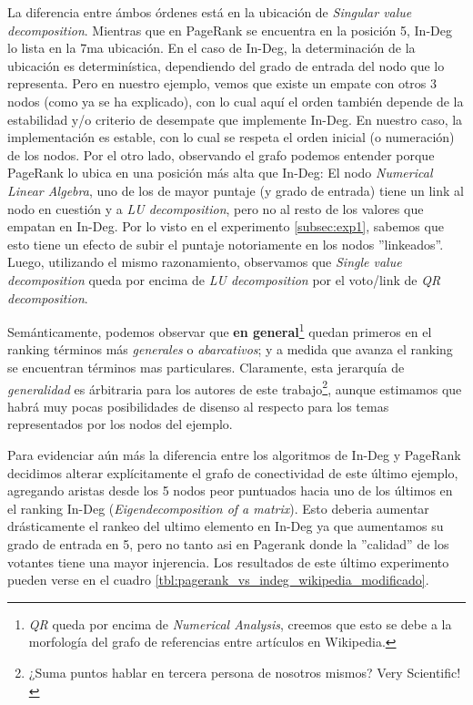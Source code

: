 \par La diferencia entre \'ambos \'ordenes est\'a en la ubicaci\'on de
\emph{Singular value decomposition}. Mientras que en PageRank se encuentra en la
posici\'on 5, In-Deg lo lista en la 7ma ubicaci\'on. En el caso de In-Deg, la
determinaci\'on de la ubicaci\'on es determin\'istica, dependiendo del grado de
entrada del nodo que lo representa. Pero en nuestro ejemplo, vemos que existe un
empate con otros 3 nodos (como ya se ha explicado), con lo cual aqu\'i el orden
tambi\'en depende de la estabilidad y/o criterio de desempate que implemente
In-Deg. En nuestro caso, la implementaci\'on es estable, con lo cual se respeta
el orden inicial (o numeraci\'on) de los nodos. Por el otro lado, observando el
grafo podemos entender porque PageRank lo ubica en una posici\'on m\'as alta que
In-Deg: El nodo \emph{Numerical Linear Algebra}, uno de los de mayor puntaje (y
grado de entrada) tiene un link al nodo en cuesti\'on y a \emph{LU
decomposition}, pero no al resto de los valores que empatan en In-Deg. Por lo
visto en el experimento \ref{subsec:exp1}, sabemos que esto tiene un efecto de
subir el puntaje notoriamente en los nodos ''linkeados''. Luego, utilizando el
mismo razonamiento, observamos que \emph{Single value decomposition} queda por
encima de \emph{LU decomposition} por el voto/link de \emph{QR decomposition}.

\par Semánticamente, podemos observar que \textbf{en general}\footnote{\emph{QR}
queda por encima de \emph{Numerical Analysis}, creemos que esto se debe a la
morfología del grafo de referencias entre artículos en Wikipedia.} quedan
primeros en el ranking términos más \emph{generales} o \emph{abarcativos}; y a
medida que avanza el ranking se encuentran términos mas particulares.
Claramente, esta jerarqu\'ia de \emph{generalidad} es \'arbitraria para los
autores de este trabajo\footnote{¿Suma puntos hablar en tercera persona de
nosotros mismos? Very Scientific!}, aunque estimamos que habr\'a muy pocas
posibilidades de disenso al respecto para los temas representados por los nodos
del ejemplo.

\par Para evidenciar aún más la diferencia entre los algoritmos de In-Deg y
PageRank decidimos alterar expl\'icitamente el grafo de conectividad de este
\'ultimo ejemplo, agregando aristas desde los 5 nodos peor puntuados hacia uno
de los últimos en el ranking In-Deg (\emph{Eigendecomposition of a matrix}).
Esto deberia aumentar drásticamente el rankeo del ultimo elemento en In-Deg ya
que aumentamos su grado de entrada en 5, pero no tanto asi en Pagerank donde la
''calidad'' de los votantes tiene una mayor injerencia. Los resultados de este
último experimento pueden verse en el cuadro
\ref{tbl:pagerank_vs_indeg_wikipedia_modificado}. 

